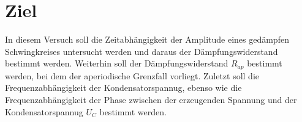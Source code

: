 
\section{Ziel}

In diesem Versuch soll die Zeitabhängigkeit der Amplitude eines gedämpfen 
Schwingkreises untersucht werden und daraus der Dämpfungswiderstand bestimmt werden.
Weiterhin soll der Dämpfungswiderstand $R_{ap}$ bestimmt werden, bei dem der 
aperiodische Grenzfall vorliegt. Zuletzt soll die Frequenzabhängigkeit der
Kondensatorspannug, ebenso wie die Frequenzabhängigkeit der Phase zwischen der 
erzeugenden Spannung und der Kondensatorspannug $U_C$ bestimmt werden. 